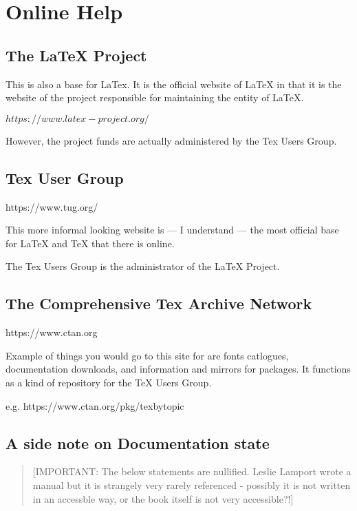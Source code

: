 \documentclass[12pt, oneside]{memoir}
\begin{document}
\section*{Online Help}

\subsection*{The LaTeX Project}

This is also a base for LaTex. It is the official website of LaTeX in that it is the website of the project responsible for maintaining the entity of LaTeX.

$https://www.latex-project.org/$

However, the project funds are actually administered by the Tex Users Group.

\subsection*{Tex User Group}

https://www.tug.org/

This more informal looking website is — I understand — the most official base for LaTeX and TeX that there is online. 

The Tex Users Group is the administrator of the LaTeX Project.

\subsection*{The Comprehensive Tex Archive Network}
\label{TUG}
https://www.ctan.org

Example of things you would go to this site for are fonts catlogues, documentation downloads, and information and mirrors for packages. It functions as a kind of repository for the TeX Users Group.

e.g.
https://www.ctan.org/pkg/texbytopic

\subsection*{A side note on Documentation state}


\begin{quotation}
[IMPORTANT: The below statements are nullified. Leslie Lamport wrote a manual but it is strangely very rarely referenced - possibly it is not written in an accessble way, or the book itself is not very accessible?!]
\end{quotation}
\end{document}
